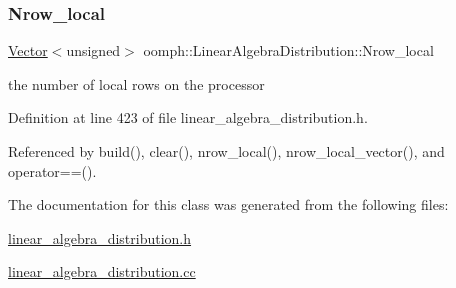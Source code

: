 \subsubsection{\texorpdfstring{Nrow\+\_\+local}{Nrow\_local}}
{\footnotesize\ttfamily \hyperlink{classoomph_1_1Vector}{Vector}$<$unsigned$>$ oomph\+::\+Linear\+Algebra\+Distribution\+::\+Nrow\+\_\+local\hspace{0.3cm}{\ttfamily [private]}}



the number of local rows on the processor 



Definition at line 423 of file linear\+\_\+algebra\+\_\+distribution.\+h.



Referenced by build(), clear(), nrow\+\_\+local(), nrow\+\_\+local\+\_\+vector(), and operator==().



The documentation for this class was generated from the following files\+:\begin{DoxyCompactItemize}
\item 
\hyperlink{linear__algebra__distribution_8h}{linear\+\_\+algebra\+\_\+distribution.\+h}\item 
\hyperlink{linear__algebra__distribution_8cc}{linear\+\_\+algebra\+\_\+distribution.\+cc}\end{DoxyCompactItemize}
